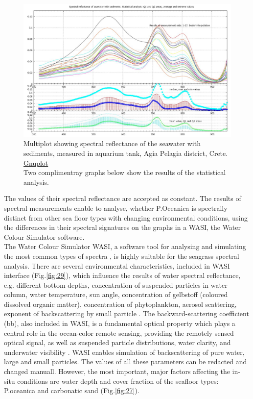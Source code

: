 \documentclass[10pt, a4paper]{article}
\begin{document}
\begin{figure}[H]
	\centering
	\includegraphics[scale=0.30]{GNU-18.jpg}
	\caption{Multiplot showing spectral reflectance of the seawater with sediments, measured in aquarium tank, Agia Pelagia district, Crete. \href{http://www.gnuplot.info/}{Gnuplot} \\Two complimentray graphs below show the results of the statistical analysis.}
	\label{fig:26}
\end{figure}

The values of their spectral reflectance are accepted as constant. The results of
spectral measurements enable to analyse, whether P.Oceanica is spectrally distinct from other sea
floor types with changing environmental conditions, using the differences in their spectral signatures
on the graphs in a WASI, the Water Colour Simulator software. \\The Water Colour Simulator WASI, a
software tool for analysing and simulating the most common types of spectra \cite{Gege05}\label{Gege05}, is highly
suitable for the seagrass spectral analysis.
There are several environmental characteristics, included in WASI interface (Fig.\ref{fig:29}), which influence the
results of water spectral reflectance, e.g. different bottom depths, concentration of suspended particles
in water column, water temperature, sun angle, concentration of gelbstoff (coloured dissolved organic
matter), concentration of phytoplankton, aerosol scattering, exponent of backscattering by small
particle \cite{Gege04}\label{Gege04}. The backward-scattering coefficient (bb), also included in WASI, is a
fundamental optical property which plays a central role in the ocean-color remote sensing, providing
the remotely sensed optical signal, as well as suspended particle distributions, water clarity, and
underwater visibility \cite{Maffione97}\label{Maffione97}. WASI enables simulation of backscattering of pure
water, large and small particles. The values of all these parameters can be redacted and changed
manuall. However, the most important, major factors affecting the in-situ conditions are water depth
and cover fraction of the seafloor types: P.oceanica and carbonatic sand (Fig.\ref{fig:27}).
\end{document}
